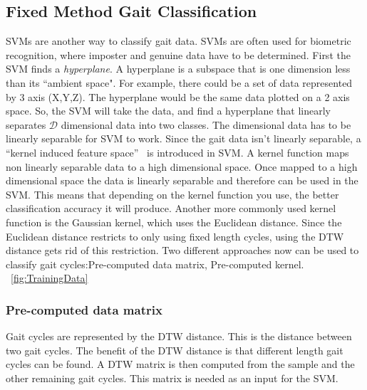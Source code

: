 \documentclass{sig-alternate}
\begin{document}
\subsection{Fixed Method Gait Classification}
	SVMs are another way to classify gait data. SVMs are often used for biometric recognition, where imposter and genuine data have to be determined. First the SVM finds a \textit{hyperplane}. A hyperplane is a subspace that is one dimension less than its ``ambient space". For example, there could be a set of data represented by 3 axis (X,Y,Z). The hyperplane would be the same data plotted on a 2 axis space. So, the SVM will take the data, and find a hyperplane that linearly separates \begin{math}\mathcal{D} \end{math} dimensional data into two classes. The dimensional data has to be linearly separable for SVM to work. Since the gait data isn't linearly separable, a ``kernel induced feature space''~\cite{Muaaz:2013} is introduced in SVM. A kernel function maps non linearly separable data to a high dimensional space. Once mapped to a high dimensional space the data is linearly separable and therefore can be used in the SVM. This means that depending on the kernel function you use, the better classification accuracy it will produce. 
	Another more commonly used kernel function is the Gaussian kernel, which uses the Euclidean distance. Since the Euclidean distance restricts to only using fixed length cycles, using the DTW distance gets rid of this restriction. Two different approaches now can be used to classify gait cycles:Pre-computed data matrix, Pre-computed kernel. ~\ref{fig:TrainingData}

\subsubsection{Pre-computed data matrix}
	Gait cycles are represented by the DTW distance. This is the distance between two gait cycles. The benefit of the DTW distance is that different length gait cycles can be found. A DTW matrix is then computed from the sample and the other remaining gait cycles. This matrix is needed as an input for the SVM. 
	
\end{document}
